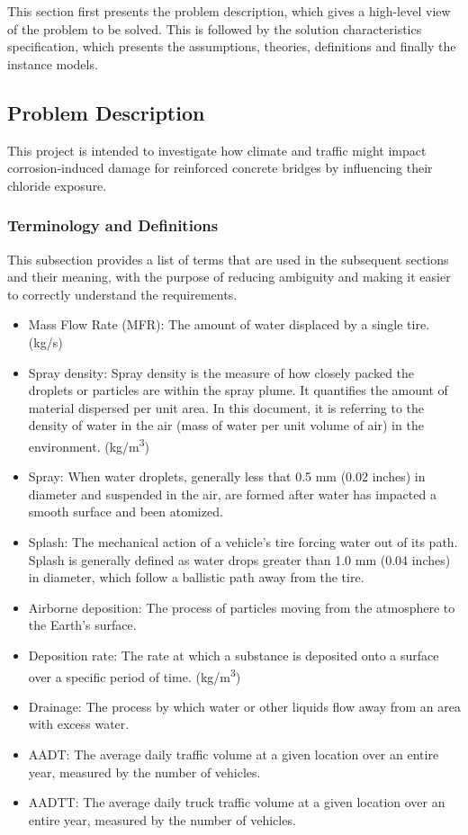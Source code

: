 \documentclass[12pt]{article}
\begin{document}
This section first presents the problem description, which gives a high-level
view of the problem to be solved.  This is followed by the solution characteristics
specification, which presents the assumptions, theories, definitions and finally
the instance models.  

\subsection{Problem Description} \label{Sec_pd}
This project is intended to investigate how climate and traffic might impact corrosion-induced damage for reinforced concrete bridges by influencing their chloride exposure.

\subsubsection{Terminology and  Definitions}
This subsection provides a list of terms that are used in the subsequent
sections and their meaning, with the purpose of reducing ambiguity and making it
easier to correctly understand the requirements.

\begin{itemize}
\item Mass Flow Rate (MFR): The amount of water displaced by a single tire. (kg/s)
\item Spray density: Spray density is the measure of how closely packed the droplets or particles are within the spray plume. It quantifies the amount of material dispersed per unit area. In this document, it is referring to the density of water in the air (mass of water per unit volume of air) in the environment. (\si{kg/m^3})
\item Spray: When water droplets, generally less that 0.5 mm (0.02 inches) in diameter and suspended in the air, are formed after water has impacted a smooth surface and been atomized.
\item Splash: The mechanical action of a vehicle’s tire forcing water out of its path. Splash is generally defined as water drops greater than 1.0 mm (0.04 inches) in diameter, which follow a ballistic path away from the tire.
\item Airborne deposition: The process of particles moving from the atmosphere to the Earth's surface.
\item Deposition rate: The rate at which a substance is deposited onto a surface over a specific period of time. (\si{kg/m^3})
\item Drainage: The process by which water or other liquids flow away from an area with excess water.
\item AADT: The average daily traffic volume at a given location over an entire year, measured by the number of vehicles.
\item AADTT:  The average daily truck traffic volume at a given location over an entire year, measured by the number of vehicles.

\end{itemize}
\end{document}
